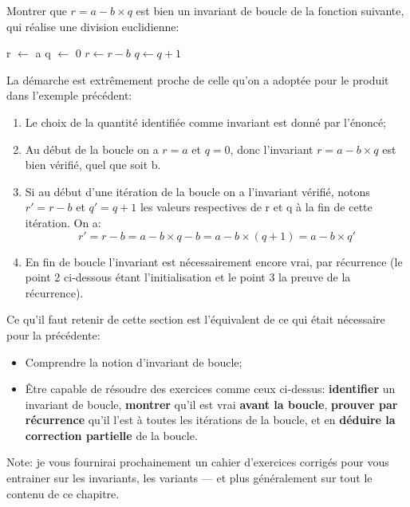 \documentclass[12pt]{article}
\begin{document}
	\begin{MonExo}
		Montrer que $r = a - b \times q$ est bien un invariant de boucle de la fonction suivante, qui réalise une division euclidienne:
		\begin{algorithmic}[1]
			\State r $\leftarrow$ a
			\State q $\leftarrow$ 0
			\State $r \leftarrow r - b$
			\State $q \leftarrow q + 1$
			\EndWhile
			\State{}
			\EndFunction
		\end{algorithmic}
	\end{MonExo}
	
	\begin{MaReponse}
		La démarche est extrêmement proche de celle qu'on a adoptée pour le produit dans l'exemple précédent:
		\begin{enumerate}
			\item Le choix de la quantité identifiée comme invariant est donné par l'énoncé;
			\item Au début de la boucle on a $r = a$ et $q = 0$, donc l'invariant $r = a - b \times q$ est bien vérifié, quel que soit b.
			\item Si au début d'une itération de la boucle on a l'invariant vérifié, notons $r' = r - b$ et $q' = q + 1$ les valeurs respectives de r et q à la fin de cette itération. On a:
			\[ r' = r - b = a - b \times q - b = a - b \times (q + 1) = a - b \times q'\]
			\item En fin de boucle l'invariant est nécessairement encore vrai, par récurrence (le point 2 ci-dessous étant l'initialisation et le point 3 la preuve de la récurrence).
		\end{enumerate}
	\end{MaReponse}
		
	\begin{MonRet}
		Ce qu'il faut retenir de cette section est l'équivalent de ce qui était nécessaire pour la précédente:
		\begin{itemize}
			\item Comprendre la notion d'invariant de boucle;
			\item Être capable de résoudre des exercices comme ceux ci-dessus: \textbf{identifier} un invariant de boucle, \textbf{montrer} qu'il est vrai \textbf{avant la boucle}, \textbf{prouver par récurrence} qu'il l'est à toutes les itérations de la boucle, et en \textbf{déduire la correction partielle }de la boucle.
		\end{itemize}
		Note: je vous fournirai prochainement un cahier d'exercices corrigés pour vous entrainer sur les invariants, les variants --- et plus généralement sur tout le contenu de ce chapitre.
	\end{MonRet}
	
\end{document}
